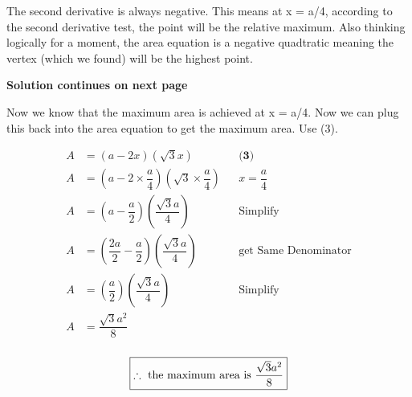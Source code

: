 \documentclass[12pt]{book}
\begin{document}
\begin{enumerate}
The second derivative is always negative. This means at x = a/4, 
according to the second derivative test, the point will be the 
relative maximum. Also thinking logically for a moment, the area 
equation is a negative quadtratic meaning the vertex (which we 
found) will be the highest point.

\vspace{0.5cm}
\textbf{Solution continues on next page}

\newpage

\vspace{0.5cm}
Now we know that the maximum area is achieved at x = a/4. Now we 
can plug this back into the area equation to get the maximum area. Use (3).

\addtolength{\jot}{0.5em}
\begin{align*}
    A &= (a - 2x)(\sqrt3x) && \textbf{(3)} \\
    A &= \left(a - 2\times\dfrac{a}{4}\right)\left(\sqrt3\times\dfrac{a}{4}\right) && x=\dfrac{a}{4} \\
    A &= \left(a - \dfrac{a}{2}\right)\left(\dfrac{\sqrt3a}{4}\right) && \text{Simplify} \\
    A &= \left(\dfrac{2a}{2} - \dfrac{a}{2}\right)\left(\dfrac{\sqrt3a}{4}\right) && \text{get Same Denominator} \\
    A &= \left(\dfrac{a}{2}\right)\left(\dfrac{\sqrt3a}{4}\right) && \text{Simplify} \\
    A &= \dfrac{\sqrt3a^2}{8} \\
\end{align*}

$$\boxed{\therefore \text{\space the maximum area is } \dfrac{\sqrt3a^2}{8} }$$

\newpage

\end{enumerate}
\end{document}
